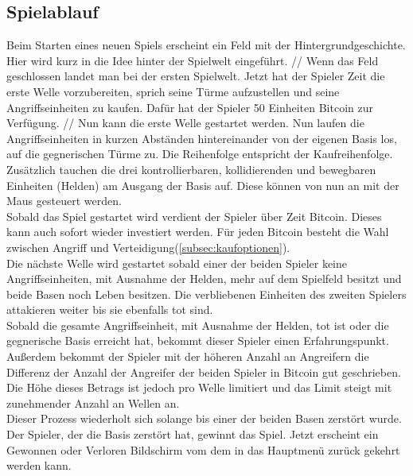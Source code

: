 \subsection{Spielablauf}
Beim Starten eines neuen Spiels erscheint ein Feld mit der
Hintergrundgeschichte. Hier wird kurz in die Idee hinter der Spielwelt
eingeführt. //
Wenn das Feld geschlossen landet man bei der ersten Spielwelt. Jetzt hat der 
Spieler Zeit die erste Welle vorzubereiten, sprich seine Türme aufzustellen 
und seine Angriffseinheiten zu kaufen. Dafür hat der Spieler 50 Einheiten Bitcoin
zur Verfügung. //
Nun kann die erste Welle gestartet werden.
Nun laufen die Angriffseinheiten in kurzen Abständen hintereinander von der
eigenen Basis los, auf die gegnerischen Türme zu. Die Reihenfolge entspricht
der Kaufreihenfolge. Zusätzlich tauchen die drei kontrollierbaren,
kollidierenden und bewegbaren Einheiten (Helden) am Ausgang der Basis auf. Diese
können von nun an mit der Maus gesteuert werden. \\
Sobald das Spiel gestartet wird verdient der Spieler über Zeit Bitcoin. Dieses
kann auch sofort wieder investiert werden. Für jeden Bitcoin besteht die
Wahl zwischen Angriff und Verteidigung(\ref{subsec:kaufoptionen}). \\

Die nächste Welle wird gestartet sobald einer der beiden Spieler keine 
Angriffseinheiten, mit Ausnahme der Helden, mehr auf dem Spielfeld besitzt
und beide Basen noch Leben besitzen. Die verbliebenen Einheiten des zweiten 
Spielers attakieren weiter bis sie ebenfalls tot sind. \\
Sobald die gesamte Angriffseinheit, mit Ausnahme der Helden, tot ist oder die 
gegnerische Basis erreicht hat, bekommt dieser Spieler einen Erfahrungspunkt. 
Außerdem bekommt der Spieler mit der höheren Anzahl an Angreifern die 
Differenz der Anzahl der Angreifer der beiden Spieler in Bitcoin gut geschrieben.
Die Höhe dieses Betrags ist jedoch pro Welle limitiert und das Limit steigt 
mit zunehmender Anzahl an Wellen an.\\

Dieser Prozess wiederholt sich solange bis einer der beiden Basen zerstört 
wurde. Der Spieler, der die Basis zerstört hat, gewinnt das Spiel. 
Jetzt erscheint ein Gewonnen oder Verloren Bildschirm vom dem in das Hauptmenü
zurück gekehrt werden kann.
